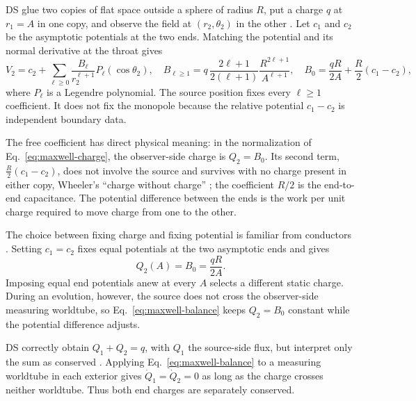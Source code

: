 \documentclass[aps,prd,10pt,onecolumn,nofootinbib,superscriptaddress,floatfix]{revtex4-2}
\begin{document}
DS glue two copies of flat space outside a sphere of radius $R$, put a charge
$q$ at $r_1=A$ in one copy, and observe the field at $(r_2,\theta_2)$ in the
other \cite{DaiStojkovic2019Observing}.  Let $c_1$ and $c_2$ be the asymptotic
potentials at the two ends.  Matching the potential
and its normal derivative at the throat gives
\begin{equation}
  V_2=c_2+\sum_{\ell\ge0}\frac{B_\ell}{r_2^{\ell+1}}
       P_\ell(\cos\theta_2),
  \quad
  B_{\ell\ge1}=q\,\frac{2\ell+1}{2(\ell+1)}
       \frac{R^{2\ell+1}}{A^{\ell+1}},
  \quad
  B_0=\frac{qR}{2A}+\frac{R}{2}(c_1-c_2),
  \label{eq:ds-multipoles}
\end{equation}
where $P_\ell$ is a Legendre polynomial.  The source position fixes every
$\ell\ge1$ coefficient.  It does not fix the monopole because the relative
potential $c_1-c_2$ is independent boundary data.

The free coefficient has direct physical meaning: in the normalization of
Eq.~\eqref{eq:maxwell-charge}, the observer-side charge is $Q_2=B_0$.  Its
second term, $\tfrac{R}{2}(c_1-c_2)$, does not involve the source and survives
with no charge present in either copy, Wheeler's ``charge without charge''
\cite{MisnerWheeler1957ClassicalPhysics}; the coefficient $R/2$ is the
end-to-end capacitance.  The potential difference between the ends is the work
per unit charge required to move charge from one to the other.

The choice between fixing charge and fixing potential is familiar from
conductors \cite[Ch.~2]{JacksonClassicalElectrodynamics}.  Setting
$c_1=c_2$ fixes equal potentials at the two asymptotic ends and gives
\begin{equation}
  Q_2(A)=B_0=\frac{qR}{2A}.
  \label{eq:ds-electric}
\end{equation}
Imposing equal end potentials anew at every $A$ selects a different static
charge.  During an evolution, however, the source does not cross the
observer-side measuring worldtube, so Eq.~\eqref{eq:maxwell-balance} keeps
$Q_2=B_0$ constant while the potential difference adjusts.

DS correctly obtain $Q_1+Q_2=q$, with $Q_1$ the source-side flux, but interpret
only the sum as conserved
\cite[discussion following Eqs.~(9) and (10)]{DaiStojkovic2019Observing}.
Applying Eq.~\eqref{eq:maxwell-balance} to a measuring worldtube in each
exterior gives $\dot Q_1=\dot Q_2=0$ as long as the charge crosses neither
worldtube.  Thus both end charges are separately conserved.
\end{document}
